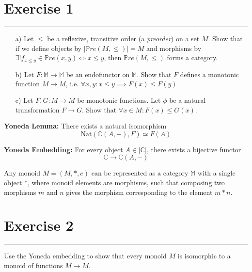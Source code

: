 \documentclass{article}
\newcommand{\seperator}{\vspace{-8pt}\hrule\vspace{8pt}}
\newcommand{\bC}{\mathbb{C}}
\newcommand{\bM}{\mathbb{M}}
\newcommand{\bPre}{\mathbb{P}re}
\newcommand{\nat}{\text{Nat}}
\begin{document}
\section*{Exercise 1}
\seperator
\begin{itemize}
	\item[a)] Let $\leq$ be a reflexive, transitive order (a \textit{preorder}) on a set $M$. Show that if we define objects by $|\bPre(M, \leq)| = M$ and morphisms by $\exists! f_{x \leq y} \in \bPre(x,y) \Leftrightarrow x \leq y$, then $\bPre(M, \leq)$ forms a category.
	\item[b)] Let $F : \bM \to \bM$ be an endofunctor on $\bM$. Show that $F$ defines a monotonic function $M \to M$, i.e. $\forall x,y : x \leq y \implies F(x) \leq F(y)$.
	\item[c)] Let $F,G : M \to M$ be monotonic functions. Let $\phi$ be a natural transformation $F \to G$. Show that $\forall x \in M: F(x) \leq G(x)$.
\end{itemize}
%
%
%
%
%
\clearpage
%
%
%
%
%
\begin{definition}
	\textbf{Yoneda Lemma:} There exists a natural isomorphism 
	\[\nat(\bC(A,-), F) \simeq F(A)\]
\end{definition}
\begin{definition}
	\textbf{Yoneda Embedding:} For every object $A \in |\bC|$, there exists a bijective functor \[\bC \to \bC(A,-)\]
\end{definition}
\begin{proposition}
	Any monoid $M = (M, *, e)$ can be represented as a category $\bM$ with a single object $*$, where monoid elements are morphisms, such that composing two morphisms $m$ and $n$ gives the morphism corresponding to the element $m * n$.
\end{proposition}
\section*{Exercise 2}
\seperator
Use the Yoneda embedding to show that every monoid $M$ is isomorphic to a monoid of functions $M \to M$. 
\end{document}

